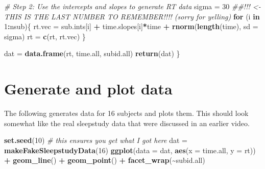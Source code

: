 \documentclass[
]{book}
\newenvironment{Shaded}{\begin{snugshade}}{\end{snugshade}}
\newcommand{\CommentTok}[1]{\textcolor[rgb]{0.56,0.35,0.01}{\textit{#1}}}
\newcommand{\ControlFlowTok}[1]{\textcolor[rgb]{0.13,0.29,0.53}{\textbf{#1}}}
\newcommand{\DataTypeTok}[1]{\textcolor[rgb]{0.13,0.29,0.53}{#1}}
\newcommand{\DecValTok}[1]{\textcolor[rgb]{0.00,0.00,0.81}{#1}}
\newcommand{\KeywordTok}[1]{\textcolor[rgb]{0.13,0.29,0.53}{\textbf{#1}}}
\newcommand{\NormalTok}[1]{#1}
\newcommand{\OperatorTok}[1]{\textcolor[rgb]{0.81,0.36,0.00}{\textbf{#1}}}
\newcommand{\StringTok}[1]{\textcolor[rgb]{0.31,0.60,0.02}{#1}}
\begin{document}
\begin{Shaded}
\begin{Highlighting}[]
  \CommentTok{\# Step 2:  Use the intercepts and slopes to generate RT data}
\NormalTok{  sigma =}\StringTok{ }\DecValTok{30}      \CommentTok{\#\#!!! <{-} THIS IS THE LAST NUMBER TO REMEMBER!!!! (sorry for yelling)}
  \ControlFlowTok{for}\NormalTok{ (i }\ControlFlowTok{in} \DecValTok{1}\OperatorTok{:}\NormalTok{nsub)\{}
\NormalTok{    rt.vec =}\StringTok{ }\NormalTok{sub.ints[i] }\OperatorTok{+}\StringTok{ }\NormalTok{time.slopes[i]}\OperatorTok{*}\NormalTok{time }\OperatorTok{+}\StringTok{ }\KeywordTok{rnorm}\NormalTok{(}\KeywordTok{length}\NormalTok{(time), }\DataTypeTok{sd =}\NormalTok{ sigma)}
\NormalTok{    rt =}\StringTok{ }\KeywordTok{c}\NormalTok{(rt, rt.vec)}
\NormalTok{  \}}
  
\NormalTok{  dat =}\StringTok{ }\KeywordTok{data.frame}\NormalTok{(rt, time.all, subid.all)}
  \KeywordTok{return}\NormalTok{(dat)}
\NormalTok{\}}
\end{Highlighting}
\end{Shaded}

\hypertarget{generate-and-plot-data}{%
\section{Generate and plot data}\label{generate-and-plot-data}}

The following generates data for 16 subjects and plots them. This should look somewhat like the real sleepstudy data that were discussed in an earlier video.

\begin{Shaded}
\begin{Highlighting}[]
\KeywordTok{set.seed}\NormalTok{(}\DecValTok{10}\NormalTok{) }\CommentTok{\# this ensures you get what I got here}
\NormalTok{dat =}\StringTok{ }\KeywordTok{makeFakeSleepstudyData}\NormalTok{(}\DecValTok{16}\NormalTok{)}
\KeywordTok{ggplot}\NormalTok{(}\DataTypeTok{data =}\NormalTok{ dat, }\KeywordTok{aes}\NormalTok{(}\DataTypeTok{x =}\NormalTok{ time.all, }\DataTypeTok{y =}\NormalTok{ rt)) }\OperatorTok{+}
\StringTok{  }\KeywordTok{geom\_line}\NormalTok{() }\OperatorTok{+}\StringTok{ }
\StringTok{  }\KeywordTok{geom\_point}\NormalTok{() }\OperatorTok{+}
\StringTok{  }\KeywordTok{facet\_wrap}\NormalTok{(}\OperatorTok{\textasciitilde{}}\NormalTok{subid.all)}
\end{Highlighting}
\end{Shaded}
\end{document}
